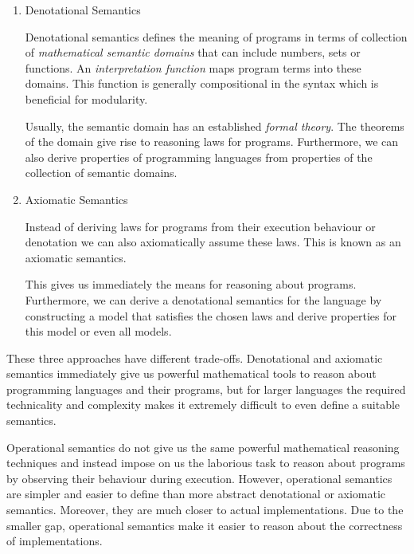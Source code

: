{\begin{enumerate}
  Operational semantics defines the meaning of programs by specifying their
  execution in a state transition system. A \emph{state transition function} or
  a \emph{state transition relation} on the terms of the programming language
  defines the possible execution steps. The program is part of the state. For
  small languages the entire state might consist of only the program. After
  taking a step we are left with an updated state that includes a residual
  program.



\item Denotational Semantics

  Denotational semantics defines the meaning of programs in terms of collection
  of \emph{mathematical semantic domains} that can include numbers, sets or
  functions. An \emph{interpretation function} maps program terms into these
  domains. This function is generally compositional in the syntax which
  is beneficial for modularity.

  Usually, the semantic domain has an established \emph{formal theory}. The
  theorems of the domain give rise to reasoning laws for programs. Furthermore,
  we can also derive properties of programming languages from properties of the
  collection of semantic domains.

\item Axiomatic Semantics

  Instead of deriving laws for programs from their execution behaviour or
  denotation we can also axiomatically assume these laws. This is known as an
  axiomatic semantics.

  This gives us immediately the means for reasoning about programs. Furthermore,
  we can derive a denotational semantics for the language by constructing a
  model that satisfies the chosen laws and derive properties for this model or
  even all models.

\end{enumerate}

These three approaches have different trade-offs. Denotational and axiomatic semantics
immediately give us powerful mathematical tools to reason about programming
languages and their programs, but for larger languages the required technicality
and complexity makes it extremely difficult to even define a suitable semantics.

Operational semantics do not give us the same powerful mathematical reasoning
techniques and instead impose on us the laborious task to reason about programs
by observing their behaviour during execution. However, operational semantics
are simpler and easier to define than more abstract denotational or axiomatic
semantics. Moreover, they are much closer to actual implementations. Due to the
smaller gap, operational semantics make it easier to reason about the
correctness of implementations.

}
